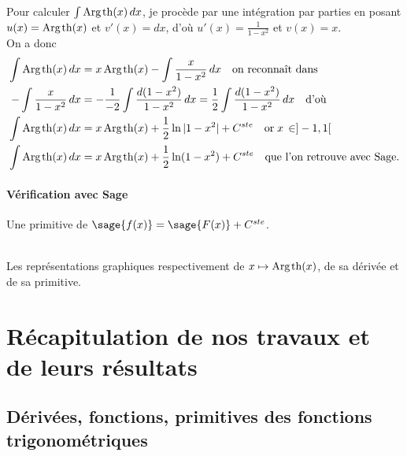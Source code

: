\documentclass[a4paper,12pt]{report}
\renewcommand{\tanh}{\mathop{\mathrm{th}}}
\renewcommand{\arg}{\mathop{\mathrm{Arg}}}
\begin{document}
Pour calculer $\int \arg\mspace{-1mu}\tanh(x) \, dx$, je procède par une intégration par parties en posant $u(x) = \arg\mspace{-1mu}\tanh(x)$ et $v'(x) = dx$, d'où $u'(x) = \frac{1}{ 1 - x^2 }$ et $ v(x) = x $. \\
On a donc
\begin{align*}
\int \arg\mspace{-1mu}\tanh(x) \, dx & = x \arg\mspace{-1mu}\tanh(x) - \int  \frac{x}{ 1 - x^2 } \, dx \quad \textrm{on reconnaît dans}\\
- \int  \frac{x}{ 1 - x^2 } \, dx & = -\frac{1}{-2} \int  \frac{d(1 - x^2 )}{ 1 - x^2 } \, dx = \frac{1}{2} \int  \frac{d(1 - x^2 )}{ 1 - x^2 } \, dx  \quad \textrm{d'où}\\
\int \arg\mspace{-1mu}\tanh(x) \, dx & = x \arg\mspace{-1mu}\tanh(x) + \frac{1}{2} \ln|1- x^2| + C^{ste} \quad \textrm{or} \; x \, \in ]-1, 1[ \\
\int \arg\mspace{-1mu}\tanh(x) \, dx & = x \arg\mspace{-1mu}\tanh(x) + \frac{1}{2} \ln(1- x^2) + C^{ste} \quad \textrm{que l'on retrouve avec Sage.}
\end{align*}


\subsubsection{Vérification avec Sage}

Une primitive de $\sage{f(x)} = \sage{F(x)} + C^{ste} $.

\begin{center}
\\
Les représentations graphiques respectivement de $x \mapsto \arg\mspace{-1mu}\tanh(x)$, de sa dérivée et de sa primitive.
\end{center}


\chapter{Récapitulation de nos travaux et de leurs résultats}


\section{Dérivées, fonctions, primitives des fonctions trigonométriques}
\end{document}
